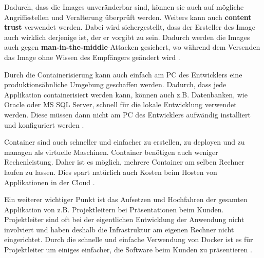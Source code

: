 Dadurch, dass die Images unveränderbar sind, können sie auch auf mögliche Angriffsstellen und Veralterung überprüft werden.
Weiters kann auch \textbf{content trust} verwendet werden. Dabei wird sichergestellt, dass der Ersteller des Image auch wirklich derjenige ist, der er vorgibt zu sein. Dadurch werden die Images auch gegen \textbf{man-in-the-middle}-Attacken gesichert, wo während dem Versenden das Image ohne Wissen des Empfängers geändert wird \cite{GettingStartedWithContainerization}.

Durch die Containerisierung kann auch einfach am PC des Entwicklers eine produktionsähnliche Umgebung geschaffen werden. Dadurch, dass jede Applikation containerisiert werden kann, können auch z.B. Datenbanken, wie Oracle oder MS SQL Server, schnell für die lokale Entwicklung verwendet werden. Diese müssen dann nicht am PC des Entwicklers aufwändig installiert und konfiguriert werden \cite{GettingStartedWithContainerization}.

Container sind auch schneller und einfacher zu erstellen, zu deployen und zu managen als virtuelle Maschinen. Container benötigen auch weniger Rechenleistung. Daher ist es möglich, mehrere Container am selben Rechner laufen zu lassen. Dies spart natürlich auch Kosten beim Hosten von Applikationen in der Cloud \cite{GettingStartedWithContainerization}.

Ein weiterer wichtiger Punkt ist das Aufsetzen und Hochfahren der gesamten Applikation von z.B. Projektleitern bei Präsentationen beim Kunden. Projektleiter sind oft bei der eigentlichen Entwicklung der Anwendung nicht involviert und haben deshalb die Infrastruktur am eigenen Rechner nicht eingerichtet. Durch die schnelle und einfache Verwendung von Docker ist es für Projektleiter um einiges einfacher, die Software beim Kunden zu präsentieren \cite{GettingStartedWithContainerization}.